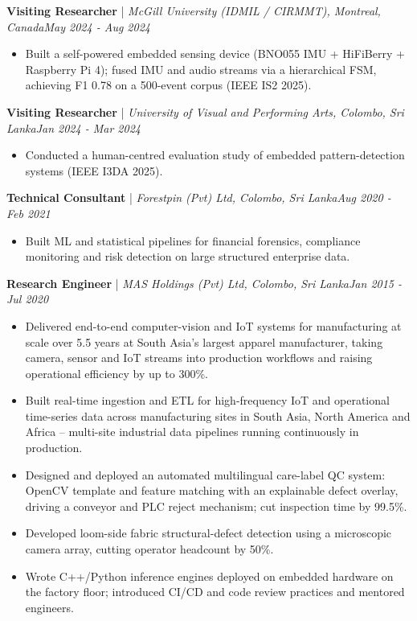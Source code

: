 \documentclass[11pt]{article}
\newenvironment{cvrole}[5]{%
  \par\noindent\textbf{\large #1} | \textit{\small #2, #3}\hfill \textit{\small #4 - #5}\par
  \begin{itemize}[leftmargin=2em, itemsep=-0.3em, topsep=-0.5em]%
}{%
  \end{itemize}\par\noindent\mbox{}\par\vspace{0.1em}%
}
\begin{document}
\begin{cvrole}{Visiting Researcher}{McGill University (IDMIL / CIRMMT)}{Montreal, Canada}{May 2024}{Aug 2024}
\item Built a self-powered embedded sensing device (BNO055 IMU + HiFiBerry + Raspberry Pi 4); fused IMU and audio streams via a hierarchical FSM, achieving F1 0.78 on a 500-event corpus (IEEE IS2 2025).
\end{cvrole}

\begin{cvrole}{Visiting Researcher}{University of Visual and Performing Arts}{Colombo, Sri Lanka}{Jan 2024}{Mar 2024}
\item Conducted a human-centred evaluation study of embedded pattern-detection systems (IEEE I3DA 2025).
\end{cvrole}

\begin{cvrole}{Technical Consultant}{Forestpin (Pvt) Ltd}{Colombo, Sri Lanka}{Aug 2020}{Feb 2021}
\item Built ML and statistical pipelines for financial forensics, compliance monitoring and risk detection on large structured enterprise data.
\end{cvrole}

\begin{cvrole}{Research Engineer}{MAS Holdings (Pvt) Ltd}{Colombo, Sri Lanka}{Jan 2015}{Jul 2020}
\item Delivered end-to-end computer-vision and IoT systems for manufacturing at scale over 5.5 years at South Asia's largest apparel manufacturer, taking camera, sensor and IoT streams into production workflows and raising operational efficiency by up to 300\%.
\item Built real-time ingestion and ETL for high-frequency IoT and operational time-series data across manufacturing sites in South Asia, North America and Africa -- multi-site industrial data pipelines running continuously in production.
\item Designed and deployed an automated multilingual care-label QC system: OpenCV template and feature matching with an explainable defect overlay, driving a conveyor and PLC reject mechanism; cut inspection time by 99.5\%.
\item Developed loom-side fabric structural-defect detection using a microscopic camera array, cutting operator headcount by 50\%.
\item Wrote C++/Python inference engines deployed on embedded hardware on the factory floor; introduced CI/CD and code review practices and mentored engineers.
\end{cvrole}
\end{document}
